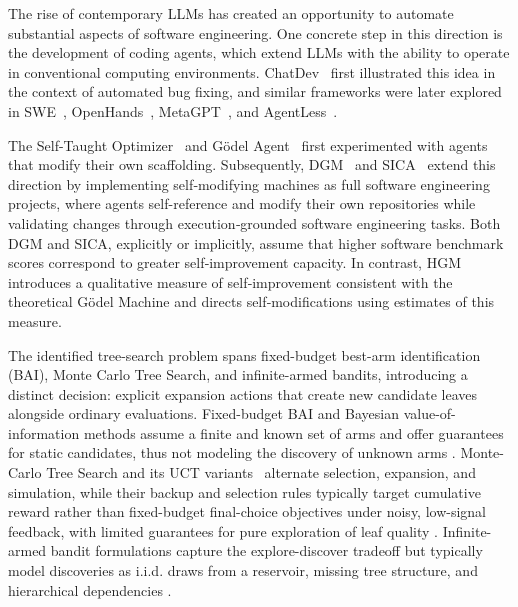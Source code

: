 \documentclass{article} %
\begin{document}
The rise of contemporary LLMs has created an opportunity to automate substantial aspects of software engineering. One concrete step in this direction is the development of coding agents, which extend LLMs with the ability to operate in conventional computing environments. ChatDev~\citep{qian2023chatdev} first illustrated this idea in the context of automated bug fixing, and similar frameworks were later explored in SWE~\citet{yang2024swe}, OpenHands~\citep{wang2024openhands}, MetaGPT~\citep{hong2024metagpt}, and AgentLess~\citep{xia2025demystifying}.

The Self-Taught Optimizer~\citep{zelikmanSelfTaughtOptimizerSTOP2024} and G\"odel Agent~\citep{yin2024g} first experimented with agents that modify their own scaffolding.
Subsequently, DGM~\citep{zhang2025dgm} and SICA~\citep{robeyns2025selfimprovingcodingagent} extend this direction by implementing self‑modifying machines as full software engineering projects, where agents self-reference and modify their own repositories while validating changes through execution‑grounded software engineering tasks.
Both DGM and SICA, explicitly or implicitly, assume that higher software benchmark scores correspond to greater self‑improvement capacity. In contrast, HGM introduces a qualitative measure of self‑improvement consistent with the theoretical G\"odel Machine and directs self‑modifications using estimates of this measure.

The identified tree-search problem spans fixed-budget best-arm identification (BAI), Monte Carlo Tree Search, and infinite-armed bandits, introducing a distinct decision: explicit expansion actions that create new candidate leaves alongside ordinary evaluations. Fixed-budget BAI and Bayesian value-of-information methods assume a finite and known set of arms and offer guarantees for static candidates, thus not modeling the discovery of unknown arms \citep{audibert2010best,karnin2013almost,frazier2008knowledge}. Monte-Carlo Tree Search and its UCT variants~\citep{coulom2006efficient,kocsis2006bandit} alternate selection, expansion, and simulation, while their backup and selection rules typically target cumulative reward rather than fixed-budget final-choice objectives under noisy, low-signal feedback, with limited guarantees for pure exploration of leaf quality \citep{kaufmann2017monte}. Infinite-armed bandit formulations capture the explore-discover tradeoff but typically model discoveries as i.i.d. draws from a reservoir, missing tree structure, and hierarchical dependencies \citep{NIPS200849ae49a2,bubeck2011pure,carpentier2015simple}.
\end{document}
